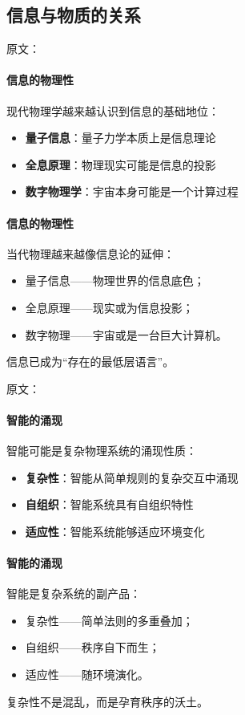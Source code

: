 \subsection{信息与物质的关系}

原文：
\paragraph{信息的物理性}
现代物理学越来越认识到信息的基础地位：
\begin{itemize}
\item \textbf{量子信息}：量子力学本质上是信息理论
\item \textbf{全息原理}：物理现实可能是信息的投影
\item \textbf{数字物理学}：宇宙本身可能是一个计算过程
\end{itemize}
\paragraph{信息的物理性}
当代物理越来越像信息论的延伸：
\begin{itemize}
\item 量子信息——物理世界的信息底色；
\item 全息原理——现实或为信息投影；
\item 数字物理——宇宙或是一台巨大计算机。
\end{itemize}
信息已成为“存在的最低层语言”。

原文：
\paragraph{智能的涌现}
智能可能是复杂物理系统的涌现性质：
\begin{itemize}
\item \textbf{复杂性}：智能从简单规则的复杂交互中涌现
\item \textbf{自组织}：智能系统具有自组织特性
\item \textbf{适应性}：智能系统能够适应环境变化
\end{itemize}
\paragraph{智能的涌现}
智能是复杂系统的副产品：
\begin{itemize}
\item 复杂性——简单法则的多重叠加；
\item 自组织——秩序自下而生；
\item 适应性——随环境演化。
\end{itemize}
复杂性不是混乱，而是孕育秩序的沃土。

